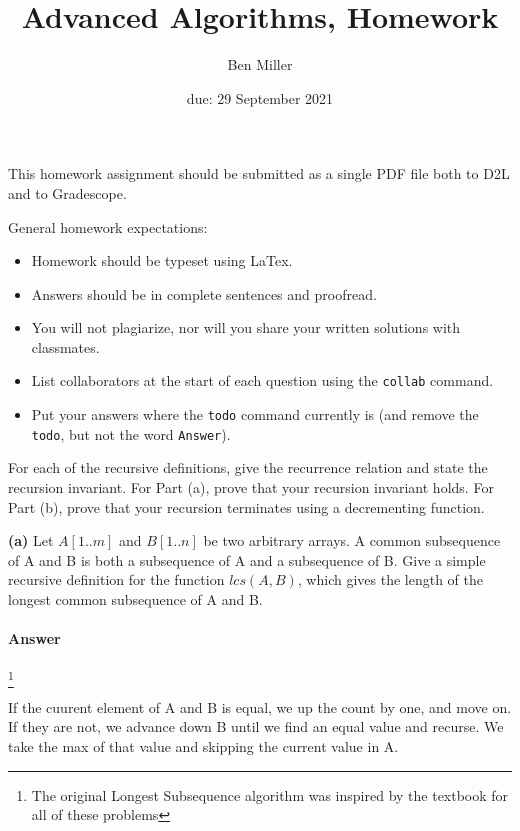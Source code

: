 \documentclass{article}
\title{Advanced Algorithms, Homework \hwnum}
\author{Ben Miller}
\date{due: 29 September 2021}
\begin{document}
\maketitle

This homework assignment should be
submitted as a single PDF file both to D2L and to Gradescope.

General homework expectations:
\begin{itemize}
    \item Homework should be typeset using LaTex.
    \item Answers should be in complete sentences and proofread.
    \item You will not plagiarize, nor will you share your written solutions
        with classmates.
    \item List collaborators at the start of each question using the
        \texttt{collab} command.
    \item Put your answers where the \texttt{todo} command currently is (and
        remove the \texttt{todo}, but not the word \texttt{Answer}).
\end{itemize}



\collab{}



For each of the recursive definitions, give the recurrence
relation and state the recursion invariant.  For Part (a), prove that your
recursion invariant holds.  For Part (b), prove that your recursion terminates
using a decrementing function.


{\bf  (a)} Let $A[1.. m]$ and $B[1.. n]$ be two arbitrary arrays. A common subsequence
of A and B is both a subsequence of A and a subsequence of B. Give
a simple recursive definition for the function $lcs(A, B)$, which gives the
length of the longest common subsequence of A and B.

\paragraph{Answer}
\footnote{The original Longest Subsequence algorithm was inspired by the textbook for all of these problems}

If the cuurent element of A and B is equal, we up the count by one, and move on.
If they are not, we advance down B until we find an equal value and recurse. We
take the max of that value and skipping the current value in A.
\end{document}
